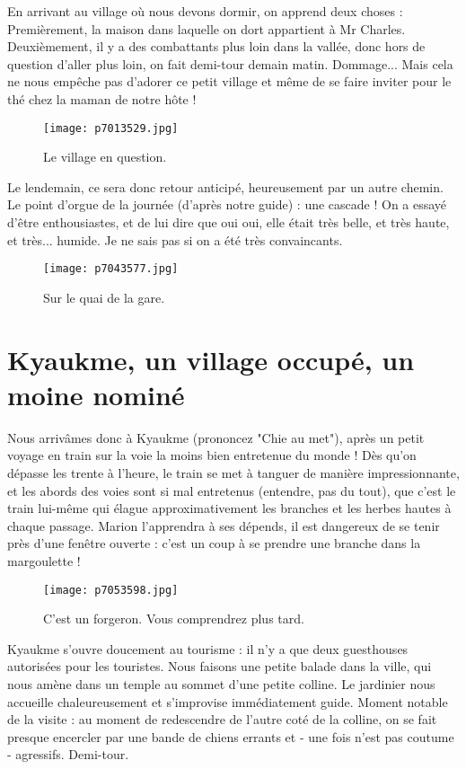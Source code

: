 \documentclass{book}
\begin{document}
En arrivant au village où nous devons dormir, on apprend deux choses : Premièrement, la maison dans laquelle on dort appartient à Mr Charles. Deuxièmement, il y a des combattants plus loin dans la vallée, donc hors de question d'aller plus loin, on fait demi-tour demain matin. Dommage... Mais cela ne nous empêche pas d'adorer ce petit village et même de se faire inviter pour le thé chez la maman de notre hôte !


\begin{figure}[h]
\centering
\texttt{[image: p7013529.jpg]}
\caption*{Le village en question.}
\end{figure}

Le lendemain, ce sera donc retour anticipé, heureusement par un autre chemin. Le point d'orgue de la journée (d'après notre guide) : une cascade ! On a essayé d'être enthousiastes, et de lui dire que oui oui, elle était très belle, et très haute, et très... humide. Je ne sais pas si on a été très convaincants.


\begin{figure}[h]
\centering
\texttt{[image: p7043577.jpg]}
\caption*{Sur le quai de la gare.}
\end{figure}



\chapter{Kyaukme, un village occupé, un moine nominé}
Nous arrivâmes donc à Kyaukme (prononcez "Chie au met"), après un petit voyage en train sur la voie la moins bien entretenue du monde ! Dès qu'on dépasse les trente à l'heure, le train se met à tanguer de manière impressionnante, et les abords des voies sont si mal entretenus (entendre, pas du tout), que c'est le train lui-même qui élague approximativement les branches et les herbes hautes à chaque passage. Marion l'apprendra à ses dépends, il est dangereux de se tenir près d'une fenêtre ouverte : c'est un coup à se prendre une branche dans la margoulette !


\begin{figure}[h]
\centering
\texttt{[image: p7053598.jpg]}
\caption*{C'est un forgeron. Vous comprendrez plus tard.}
\end{figure}

Kyaukme s'ouvre doucement au tourisme : il n'y a que deux guesthouses autorisées pour les touristes. Nous faisons une petite balade dans la ville, qui nous amène dans un temple au sommet d'une petite colline. Le jardinier nous accueille chaleureusement et s'improvise immédiatement guide. Moment notable de la visite : au moment de redescendre de l'autre coté de la colline, on se fait presque encercler par une bande de chiens errants et - une fois n'est pas coutume - agressifs. Demi-tour.
\end{document}
